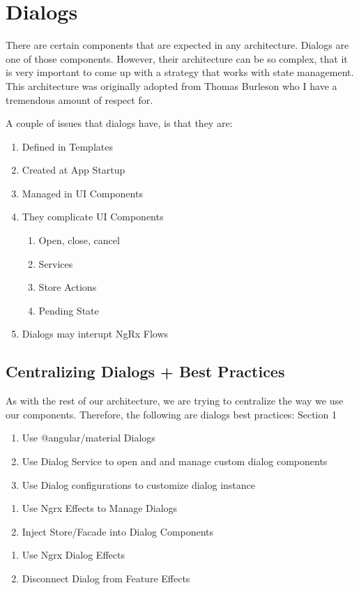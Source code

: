\maketitle{}
\section{ Dialogs }

There are certain components that are expected in any architecture. Dialogs are
one of those components. However, their architecture can be so complex, that it
is very important to come up with a strategy that works with state management.
This architecture was originally adopted from Thomas Burleson who I have a
tremendous amount of respect for.

A couple of issues that dialogs have, is that they are:
\begin{enumerate}
  \item Defined in Templates
  \item Created at App Startup
  \item Managed in UI Components
  \item They complicate UI Components
    \begin{enumerate}
      \item Open, close, cancel
      \item Services
      \item Store Actions
      \item Pending State
    \end{enumerate}
  \item Dialogs may interupt NgRx Flows
\end{enumerate}

\subsection{ Centralizing Dialogs + Best Practices}
As with the rest of our architecture, we are trying to centralize the way we
use our components. Therefore, the following are dialogs best practices:
Section 1
\begin{enumerate}
  \item Use @angular/material Dialogs
  \item Use Dialog Service to open and and manage custom dialog components
  \item Use Dialog configurations to customize dialog instance
\end{enumerate}
\begin{enumerate}
  \item Use Ngrx Effects to Manage Dialogs
  \item Inject Store/Facade into Dialog Components
\end{enumerate}

\begin{enumerate}
  \item Use Ngrx Dialog Effects
  \item Disconnect Dialog from Feature Effects
\end{enumerate}
